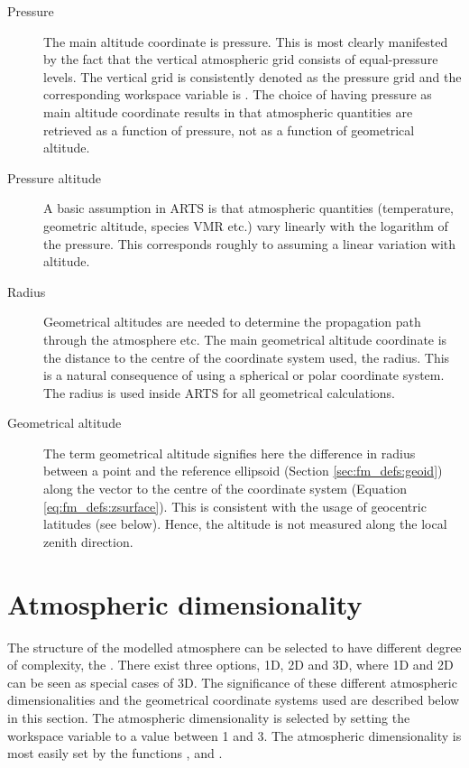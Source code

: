 \begin{description}
  
\item[Pressure] The main altitude coordinate is
  pressure. This is most clearly manifested by the fact that the
  vertical atmospheric grid consists of equal-pressure levels.
  The vertical grid is consistently denoted as the pressure grid and
  the corresponding workspace variable is . The
  choice of having pressure as main altitude coordinate results in
  that atmospheric quantities are retrieved as a function of pressure,
  not as a function of geometrical altitude.
  
\item[Pressure altitude] A basic assumption
  in ARTS is that atmospheric quantities (temperature, geometric
  altitude, species VMR etc.) vary linearly with the logarithm of the
  pressure. This corresponds roughly to assuming a linear variation
  with altitude. 

\item[Radius] Geometrical altitudes are
  needed to determine the propagation path through the atmosphere etc.
  The main geometrical altitude coordinate is the distance to the
  centre of the coordinate system used, the radius. This is a natural
  consequence of using a spherical or polar coordinate system. The
  radius is used inside ARTS for all geometrical calculations.
  
\item[Geometrical altitude] The term geometrical
  altitude signifies here the difference in radius between a point and the
  reference ellipsoid (Section \ref{sec:fm_defs:geoid}) along the vector to the
  centre of the coordinate system (Equation \ref{eq:fm_defs:zsurface}). This is
  consistent with the usage of geocentric latitudes (see below). Hence, the
  altitude is not measured along the local zenith direction.
\end{description}



\section{Atmospheric dimensionality}
\label{sec:fm_defs:atmdim}

The structure of the modelled atmosphere can be selected to have different
degree of complexity, the . There exist
three options, 1D, 2D and 3D, where 1D and 2D can be seen as special cases of
3D. The significance of these different atmospheric dimensionalities and the
geometrical coordinate systems used are described below in this section. The
atmospheric dimensionality is selected by setting the workspace variable
 to a value between 1 and 3. The atmospheric
dimensionality is most easily set by the functions ,
 and .

